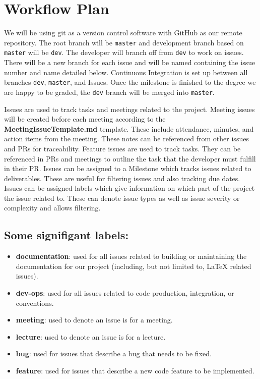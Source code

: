 \documentclass{article}
\def\code#1{\texttt{#1}}
\begin{document}
\section{Workflow Plan}

We will be using git as a version control software with GitHub as our remote repository. The root branch will be \code{master} and development branch based on \code{master} will be \code{dev}. The developer will branch off from \code{dev} to work on issues. There will be a new branch for each issue and will be named containing the issue number and name detailed below. Continuous Integration is set up between all branches \code{dev}, \code{master}, and Issues. Once the milestone is finished to the degree we are happy to be graded, the \code{dev} branch will be merged into \code{master}.

Issues are used to track tasks and meetings related to the project. Meeting issues will be created before each meeting according to the \textbf{MeetingIssueTemplate.md} template. These include attendance, minutes, and action items from the meeting. These notes can be referenced from other issues and PRs for traceability.
Feature issues are used to track tasks. They can be referenced in PRs and meetings to outline the task that the developer must fulfill in their PR.
Issues can be assigned to a Milestone which tracks issues related to deliverables. These are useful for filtering issues and also tracking due dates.
Issues can be assigned labels which give information on which part of the project the issue related to. These can denote issue types as well as issue severity or complexity and allows filtering.

\subsection{Some signifigant labels:}

\begin{itemize}
	\item \textbf{documentation}: used for all issues related to building or maintaining the documentation for our project (including, but not limited to, LaTeX related issues).
	\item \textbf{dev-ops}: used for all issues related to code production, integration, or conventions.
	\item \textbf{meeting}: used to denote an issue is for a meeting.
	\item \textbf{lecture}: used to denote an issue is for a lecture.
	\item \textbf{bug}: used for issues that describe a bug that needs to be fixed.
	\item \textbf{feature}: used for issues that describe a new code feature to be implemented.
\end{itemize}
\end{document}
